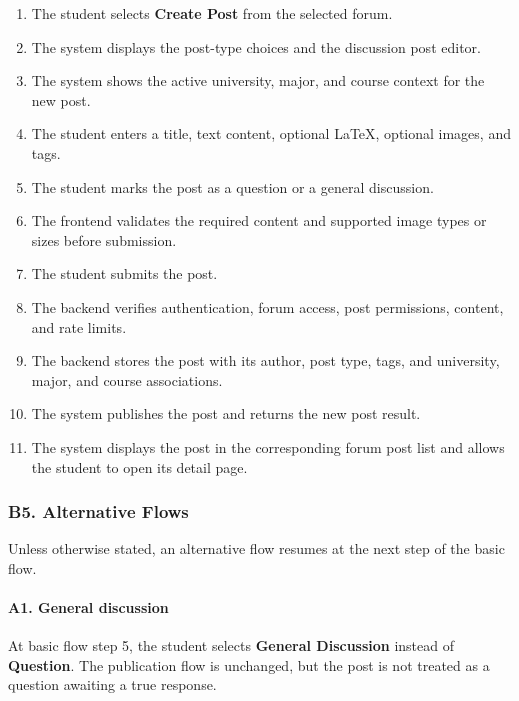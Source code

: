 \documentclass[12pt]{article}
\begin{document}
\begin{enumerate}
\item The student selects \textbf{Create Post} from the selected forum.
\item The system displays the post-type choices and the discussion post editor.
\item The system shows the active university, major, and course context for the new post.
\item The student enters a title, text content, optional LaTeX, optional images, and tags.
\item The student marks the post as a question or a general discussion.
\item The frontend validates the required content and supported image types or sizes before submission.
\item The student submits the post.
\item The backend verifies authentication, forum access, post permissions, content, and rate limits.
\item The backend stores the post with its author, post type, tags, and university, major, and course associations.
\item The system publishes the post and returns the new post result.
\item The system displays the post in the corresponding forum post list and allows the student to open its detail page.
\end{enumerate}
\par\medskip

\hypertarget{sec:b5-alternative-flows}{}
\subsubsection*{B5. Alternative Flows}
\par\medskip

Unless otherwise stated, an alternative flow resumes at the next step of the basic flow.
\par\medskip

\hypertarget{sec:a1-general-discussion}{}
\paragraph*{A1. General discussion}
\par\medskip

At basic flow step 5, the student selects \textbf{General Discussion} instead of \textbf{Question}. The publication flow is unchanged, but the post is not treated as a question awaiting a true response.
\par\medskip
\end{document}

